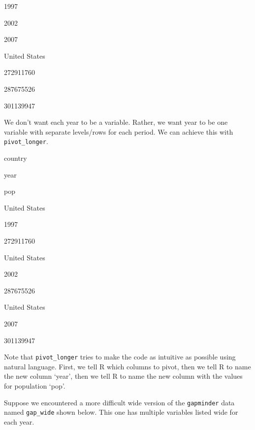 \documentclass[
]{book}
\newenvironment{Shaded}{\begin{snugshade}}{\end{snugshade}}
\newcommand{\DataTypeTok}[1]{\textcolor[rgb]{0.13,0.29,0.53}{#1}}
\newcommand{\KeywordTok}[1]{\textcolor[rgb]{0.13,0.29,0.53}{\textbf{#1}}}
\newcommand{\NormalTok}[1]{#1}
\newcommand{\OperatorTok}[1]{\textcolor[rgb]{0.81,0.36,0.00}{\textbf{#1}}}
\newcommand{\StringTok}[1]{\textcolor[rgb]{0.31,0.60,0.02}{#1}}
\begin{document}
1997

2002

2007

United States

272911760

287675526

301139947

We don't want each year to be a variable. Rather, we want year to be one variable with separate levels/rows for each period. We can achieve this with \texttt{pivot\_longer}.

\begin{Shaded}
\end{Shaded}

country

year

pop

United States

1997

272911760

United States

2002

287675526

United States

2007

301139947

Note that \texttt{pivot\_longer} tries to make the code as intuitive as possible using natural language. First, we tell R which columns to pivot, then we tell R to name the new column `year', then we tell R to name the new column with the values for population `pop'.

Suppose we encountered a more difficult wide version of the \texttt{gapminder} data named \texttt{gap\_wide} shown below. This one has multiple variables listed wide for each year.

\hypertarget{htmlwidget-5b9a6b2b38f01f96e463}{}
\begin{datatables}

\end{datatables}
\end{document}
